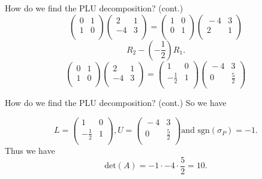 \documentclass{beamer}
\begin{document}
\begin{frame}{How do we find the PLU decomposition? (cont.)}
    \pause
    \[
        \begin{pmatrix}{}
            0 & 1 \\
                1 & 0 \\
            \end{pmatrix}\begin{pmatrix}{}
            2 & 1 \\
                -4 & 3 \\
        \end{pmatrix}
        =\begin{pmatrix}{}
            1 & 0 \\
                0 & 1 \\
        \end{pmatrix}
        \begin{pmatrix}{}
            -4 & 3 \\
                2 & 1 \\
        \end{pmatrix}
    \]
    \pause
    \[
    R_2-(-\frac{1}{2})R_1. 
    \]\pause
    \[
        \begin{pmatrix}{}
            0 & 1 \\
                1 & 0 \\
            \end{pmatrix}\begin{pmatrix}{}
            2 & 1 \\
                -4 & 3 \\
        \end{pmatrix}
        =\begin{pmatrix}{}
            1 & 0 \\
                -\frac{1}{2} & 1 \\
        \end{pmatrix}
        \begin{pmatrix}{}
            -4 & 3 \\
                0 & \frac{5}{2} \\
        \end{pmatrix}
    \]

\end{frame}



\begin{frame}{How do we find the PLU decomposition? (cont.)}
    So we have

    \[L=\begin{pmatrix}{}
            1 & 0 \\
                -\frac{1}{2} & 1 \\
        \end{pmatrix}, U=\begin{pmatrix}{}
            -4 & 3 \\
                0 & \frac{5}{2} \\
    \end{pmatrix} \text{and sgn} (\sigma_P)=-1.\]
    \pause
    Thus we have
    \[
        \text{det}(A)
        =-1\cdot-4\cdot\frac{5}{2}=10.
    \]

\end{frame}
\end{document}
